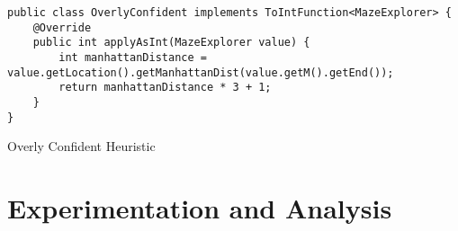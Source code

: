\documentclass[12pt]{article}
\begin{document}
\begin{listing}[h!]
    
\begin{verbatim}
public class OverlyConfident implements ToIntFunction<MazeExplorer> {
    @Override
    public int applyAsInt(MazeExplorer value) {
        int manhattanDistance = value.getLocation().getManhattanDist(value.getM().getEnd());
        return manhattanDistance * 3 + 1;
    }
}

\end{verbatim}
\caption{Overly Confident Heuristic}\label{list:overly}
\end{listing}

\section{Experimentation and Analysis}


\end{document}
